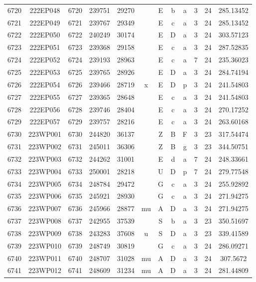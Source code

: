 \begin{tabular}{|*{12}{c|}}
6720 & 222EP048 & 6720 & 239751 & 29270 &  & E & b & a & 3 & 24 & 285.13452 \\ 
6721 & 222EP049 & 6721 & 239767 & 29349 &  & E & c & a & 3 & 24 & 285.13452 \\ 
6722 & 222EP050 & 6722 & 240249 & 30174 &  & E & D & a & 3 & 24 & 303.57123 \\ 
6723 & 222EP051 & 6723 & 239368 & 29158 &  & E & c & a & 3 & 24 & 287.52835 \\ 
6724 & 222EP052 & 6724 & 239193 & 28963 &  & E & c & a & 7 & 24 & 235.36023 \\ 
6725 & 222EP053 & 6725 & 239765 & 28926 &  & E & D & a & 3 & 24 & 284.74194 \\ 
6726 & 222EP054 & 6726 & 239466 & 28719 & x & E & D & p & 3 & 24 & 241.54803 \\ 
6727 & 222EP055 & 6727 & 239365 & 28648 &  & E & c & a & 3 & 24 & 241.54803 \\ 
6728 & 222EP056 & 6728 & 239746 & 28404 &  & E & c & a & 3 & 24 & 270.17252 \\ 
6729 & 222EP057 & 6729 & 239757 & 28216 &  & E & c & a & 3 & 24 & 263.60168 \\ 
6730 & 223WP001 & 6730 & 244820 & 36137 &  & Z & B & F & 3 & 23 & 317.54474 \\ 
6731 & 223WP002 & 6731 & 245011 & 36306 &  & Z & B & g & 3 & 23 & 344.50751 \\ 
6732 & 223WP003 & 6732 & 244262 & 31001 &  & E & d & a & 7 & 24 & 248.33661 \\ 
6733 & 223WP004 & 6733 & 250001 & 28218 &  & U & D & p & 7 & 24 & 279.77548 \\ 
6734 & 223WP005 & 6734 & 248784 & 29472 &  & G & c & a & 3 & 24 & 255.92892 \\ 
6735 & 223WP006 & 6735 & 245921 & 28930 &  & G & c & a & 3 & 24 & 271.94275 \\ 
6736 & 223WP007 & 6736 & 245966 & 28877 & mu & A & D & a & 3 & 24 & 271.94275 \\ 
6737 & 223WP008 & 6737 & 242955 & 37539 &  & S & b & a & 3 & 23 & 350.51697 \\ 
6738 & 223WP009 & 6738 & 243283 & 37608 & u & S & D & a & 3 & 23 & 339.41589 \\ 
6739 & 223WP010 & 6739 & 248749 & 30819 &  & G & c & a & 3 & 24 & 286.09271 \\ 
6740 & 223WP011 & 6740 & 248707 & 31028 & mu & A & D & a & 3 & 24 & 307.5672 \\ 
6741 & 223WP012 & 6741 & 248609 & 31234 & mu & A & D & a & 3 & 24 & 281.44809 \\ 

\end{tabular}
